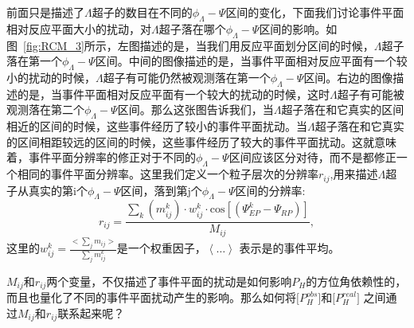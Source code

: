 前面只是描述了$\Lambda$超子的数目在不同的$\phi_{\Lambda}-\Psi$区间的变化，下面我们讨论事件平面相对反应平面大小的扰动，对$\Lambda$超子落在哪个$\phi_{\Lambda}-\Psi$区间的影响。如图~\ref{fig:RCM_3}所示，左图描述的是，当我们用反应平面划分区间的时候，$\Lambda$超子落在第一个$\phi_{\Lambda}-\Psi$区间。中间的图像描述的是，当事件平面相对反应平面有一个较小的扰动的时候，$\Lambda$超子有可能仍然被观测落在第一个$\phi_{\Lambda}-\Psi$区间。右边的图像描述的是，当事件平面相对反应平面有一个较大的扰动的时候，这时$\Lambda$超子有可能被观测落在第二个$\phi_{\Lambda}-\Psi$区间。那么这张图告诉我们，当$\Lambda$超子落在和它真实的区间相近的区间的时候，这些事件经历了较小的事件平面扰动。当$\Lambda$超子落在和它真实的区间相距较远的区间的时候，这些事件经历了较大的事件平面扰动。这就意味着，事件平面分辨率的修正对于不同的$\phi_{\Lambda}-\Psi$区间应该区分对待，而不是都修正一个相同的事件平面分辨率。这里我们定义一个粒子层次的分辨率$r_{ij}$,用来描述$\Lambda$超子从真实的第i个$\phi_{\Lambda}-\Psi$区间，落到第j个$\phi_{\Lambda}-\Psi$区间的分辨率:
\begin{equation}
\label{eq:r_ij}
r_{ij} = \frac{\sum_{k} (m^{k}_{ij}) \cdot w_{ij}^k \cdot \mathrm{cos}[(\Psi_{EP}^{k} - \Psi_{RP})]} {M_{ij}} ,
\end{equation}
这里的$w_{ij}^k = \frac{<\sum_{j}m_{ij}>}{\sum_{j}m_{ij}^{k}}$是一个权重因子，$\left\langle\dots\right\rangle$ 表示是的事件平均。

$M_{ij}$和$r_{ij}$两个变量，不仅描述了事件平面的扰动是如何影响$P_{H}$的方位角依赖性的，而且也量化了不同的事件平面扰动产生的影响。那么如何将$\Big[ P_{H}^{obs} \Big]$和$[ P_{H}^{real} \Big ]$ 之间通过$M_{ij}$和$r_{ij}$联系起来呢？




